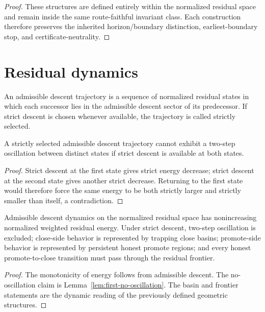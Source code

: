 \begin{proof}
These structures are defined entirely within the normalized residual space and remain inside the same route-faithful invariant class. Each construction therefore preserves the inherited horizon/boundary distinction, earliest-boundary stop, and certificate-neutrality.
\end{proof}

\section{Residual dynamics}
\begin{definition}\label{def:admissible-descent-trajectory}
An admissible descent trajectory is a sequence of normalized residual states in which each successor lies in the admissible descent sector of its predecessor. If strict descent is chosen whenever available, the trajectory is called strictly selected.
\end{definition}

\begin{lemma}\label{lem:first-no-oscillation}
A strictly selected admissible descent trajectory cannot exhibit a two-step oscillation between distinct states if strict descent is available at both states.
\end{lemma}

\begin{proof}
Strict descent at the first state gives strict energy decrease; strict descent at the second state gives another strict decrease. Returning to the first state would therefore force the same energy to be both strictly larger and strictly smaller than itself, a contradiction.
\end{proof}

\begin{theorem}\label{thm:dynamic-control}
Admissible descent dynamics on the normalized residual space has nonincreasing normalized weighted residual energy. Under strict descent, two-step oscillation is excluded; close-side behavior is represented by trapping close basins; promote-side behavior is represented by persistent honest promote regions; and every honest promote-to-close transition must pass through the residual frontier.
\end{theorem}

\begin{proof}
The monotonicity of energy follows from admissible descent. The no-oscillation claim is Lemma~\ref{lem:first-no-oscillation}. The basin and frontier statements are the dynamic reading of the previously defined geometric structures.
\end{proof}

